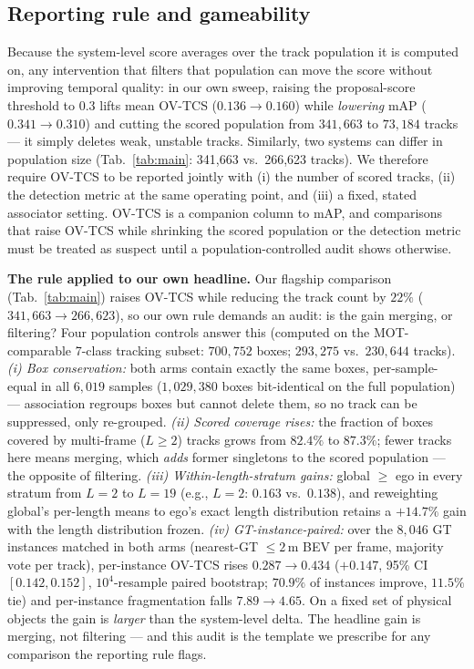 \documentclass[10pt,twocolumn,letterpaper]{article}
\begin{document}
\subsection{Reporting rule and gameability}
\label{sec:gaming}
Because the system-level score averages over the track population it is
computed on, any intervention that filters that population can move
the score without improving temporal quality: in our own sweep, raising the
proposal-score threshold to $0.3$ lifts mean OV-TCS ($0.136\!\to\!0.160$)
while \emph{lowering} mAP ($0.341\!\to\!0.310$) and cutting the scored
population from $341{,}663$ to $73{,}184$ tracks --- it simply deletes weak,
unstable tracks. Similarly, two systems can differ in population size
(Tab.~\ref{tab:main}: 341{,}663 vs.\ 266{,}623 tracks). We therefore require
OV-TCS to be reported jointly with (i) the number of scored tracks, (ii) the
detection metric at the same operating point, and (iii) a fixed, stated
associator setting. OV-TCS is a companion column to mAP, and comparisons that
raise OV-TCS while shrinking the scored population or the detection metric
must be treated as suspect until a population-controlled audit shows
otherwise.

\noindent\textbf{The rule applied to our own headline.} Our flagship
comparison (Tab.~\ref{tab:main}) raises OV-TCS while reducing the track count
by $22\%$ ($341{,}663\!\to\!266{,}623$), so our own rule demands an audit: is
the gain merging, or filtering? Four population controls answer this
(computed on the MOT-comparable 7-class tracking subset: $700{,}752$ boxes;
$293{,}275$ vs.\ $230{,}644$ tracks). \emph{(i) Box conservation:} both arms
contain exactly the same boxes, per-sample-equal in all $6{,}019$ samples
($1{,}029{,}380$ boxes bit-identical on the full population) --- association
regroups boxes but cannot delete them, so no track can be suppressed, only
re-grouped. \emph{(ii) Scored coverage rises:} the fraction of boxes covered
by multi-frame ($L\ge2$) tracks grows from $82.4\%$ to $87.3\%$; fewer tracks
here means merging, which \emph{adds} former singletons to the scored
population --- the opposite of filtering. \emph{(iii) Within-length-stratum
gains:} global $\ge$ ego in every stratum from $L{=}2$ to $L{=}19$ (e.g.,
$L{=}2$: $0.163$ vs.\ $0.138$), and reweighting global's per-length means to
ego's exact length distribution retains a $+14.7\%$ gain with the length
distribution frozen. \emph{(iv) GT-instance-paired:} over the $8{,}046$ GT
instances matched in both arms (nearest-GT $\le 2$\,m BEV per frame, majority
vote per track), per-instance OV-TCS rises $0.287\!\to\!0.434$ ($+0.147$,
95\% CI $[0.142, 0.152]$, $10^4$-resample paired bootstrap; $70.9\%$ of
instances improve, $11.5\%$ tie) and per-instance fragmentation falls
$7.89\!\to\!4.65$. On a fixed set of physical objects the gain is
\emph{larger} than the system-level delta. The headline gain is merging, not
filtering --- and this audit is the template we prescribe for any comparison
the reporting rule flags.
\end{document}
